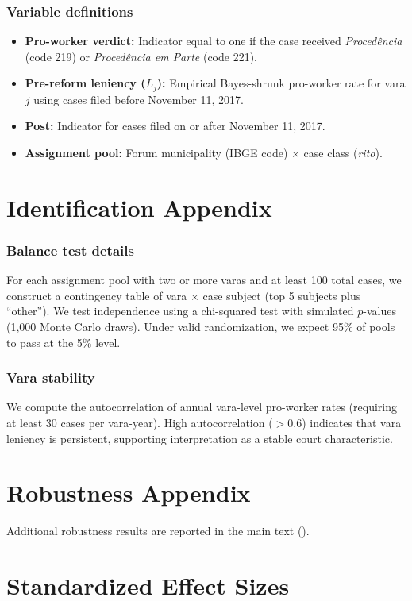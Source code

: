 \documentclass[12pt]{article}
\begin{document}
\subsubsection*{Variable definitions}
\begin{itemize}
\item \textbf{Pro-worker verdict:} Indicator equal to one if the case received \textit{Proced\^{e}ncia} (code 219) or \textit{Proced\^{e}ncia em Parte} (code 221).
\item \textbf{Pre-reform leniency ($L_j$):} Empirical Bayes-shrunk pro-worker rate for vara $j$ using cases filed before November 11, 2017.
\item \textbf{Post:} Indicator for cases filed on or after November 11, 2017.
\item \textbf{Assignment pool:} Forum municipality (IBGE code) $\times$ case class (\textit{rito}).
\end{itemize}

\section{Identification Appendix}

\subsubsection*{Balance test details} For each assignment pool with two or more varas and at least 100 total cases, we construct a contingency table of vara $\times$ case subject (top 5 subjects plus ``other''). We test independence using a chi-squared test with simulated $p$-values (1,000 Monte Carlo draws). Under valid randomization, we expect 95\% of pools to pass at the 5\% level.

\subsubsection*{Vara stability} We compute the autocorrelation of annual vara-level pro-worker rates (requiring at least 30 cases per vara-year). High autocorrelation ($> 0.6$) indicates that vara leniency is persistent, supporting interpretation as a stable court characteristic.

\section{Robustness Appendix}

Additional robustness results are reported in the main text ().

\section{Standardized Effect Sizes}
\label{sec:sde}


\end{document}
